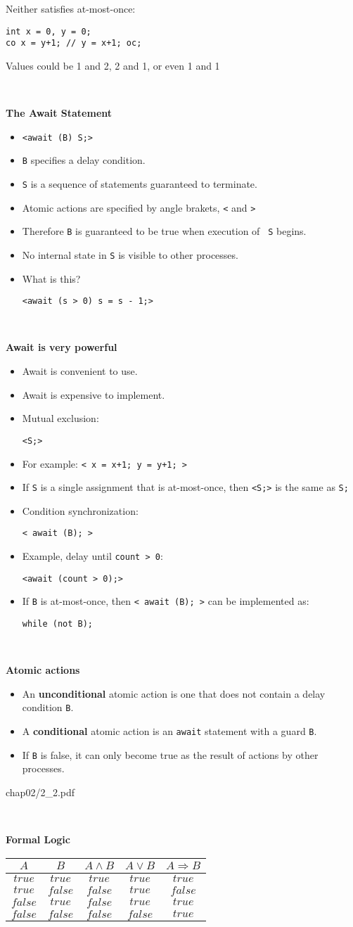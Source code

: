 \documentclass{article}
\newcommand{\myfig}[1]{\begin{overpic}[scale=1.5]{#1}}
\newcommand{\myfigend}{\end{overpic}\newpage}
\newcommand{\bi}{\begin{itemize}}
\newcommand{\ii}{\item}
\newcommand{\ei}{\end{itemize}}
\newcommand{\ti}[1]{
\mbox{~}

\vspace{1.25in}
\centerline{\bf #1}}
\begin{document}
\vspace{1in}

Neither satisfies at-most-once:
\begin{verbatim}
int x = 0, y = 0;
co x = y+1; // y = x+1; oc;
\end{verbatim}
Values could be 1 and 2, 2 and 1, or even 1 and 1

\newpage
\ti{The Await Statement}

\bi
\ii {\tt <await (B) S;>}
\ii {\tt B} specifies a delay condition.
\ii {\tt S} is a sequence of statements guaranteed to terminate.
\ii Atomic actions are specified by angle brakets, {\tt <} and {\tt >}
\ii Therefore {\tt B} is guaranteed to be true when execution of {\tt
  S} begins.
\ii No internal state in {\tt S} is visible to other processes.
\ii What is this?

\centerline {\tt <await (s > 0) s = s - 1;>}
\ei

\newpage
\ti{Await is very powerful}
\bi
\ii Await is convenient to use.
\ii Await is expensive to implement.
\ii Mutual exclusion:

\centerline{\tt <S;>}

\ii For example:  {\tt < x = x+1; y = y+1; > }
\ii If {\tt S} is a single assignment that is at-most-once, then {\tt <S;>}
is the same as {\tt S;}
\ii Condition synchronization:

\centerline{\tt < await (B); >}

\ii Example, delay until {\tt count > 0}:

\centerline{\tt <await (count > 0);>}

\ii If {\tt B} is at-most-once, then {\tt < await (B); >} can be
implemented as:

\centerline{\tt while (not B);}
\ei

\newpage
\ti{Atomic actions}
\bi
\ii An {\bf unconditional} atomic action is one that does not contain
a delay condition {\tt B}.
\ii A {\bf conditional} atomic action is an {\tt await} statement with
a guard {\tt B}.  
\ii If {\tt B} is false, it can only become true as the result of
actions by other processes.
\ei


\newpage
\myfig{chap02/2_2.pdf}
\myfigend

\ti{Formal Logic}

\begin{center}
\begin{tabular}{cc|ccc}
$ A $&$ B $&$ A \wedge B $&$ A \vee B $&$ A \Rightarrow B $\\\hline
$true$&$ true$&$ true$&$true$&$true$\\
$true$&$ false$&$false$&$true$&$false$\\
$false$&$ true$&$false$&$true$&$true$\\
$false$&$ false$&$false$&$false$&$true$\\
\end{tabular}
\end{center}
\end{document}
